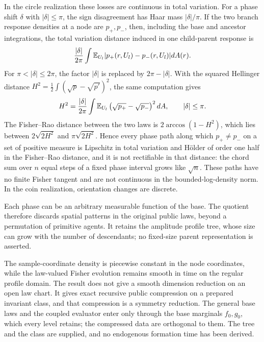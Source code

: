 In the circle realization these losses are continuous in total variation. For a phase shift $\delta$ with $|\delta|\le\pi$, the sign disagreement has Haar mass $|\delta|/\pi$. If the two branch response densities at a node are $p_+,p_-$, then, including the base and ancestor integrations, the total variation distance induced in one child-parent response is
\begin{equation}
 \frac{|\delta|}{2\pi}\int\mathbb E_{U_l}|p_+(r,U_l)-p_-(r,U_l)|dA(r).
 \label{eq:boundary-tree-tv}
\end{equation}
For $\pi<|\delta|\le2\pi$, the factor $|\delta|$ is replaced by $2\pi-|\delta|$. With the squared Hellinger distance $H^2=\frac12\int(\sqrt{p}-\sqrt{p'})^2$, the same computation gives
\begin{equation}
 H^2=\frac{|\delta|}{2\pi}\int\mathbb E_{U_l}\left(\sqrt{p_+}-\sqrt{p_-}\right)^2dA,
 \qquad |\delta|\le\pi.
 \label{eq:boundary-tree-hellinger}
\end{equation}
The Fisher--Rao distance between the two laws is $2\arccos(1-H^2)$, which lies between $2\sqrt{2H^2}$ and $\pi\sqrt{2H^2}$. Hence every phase path along which $p_+\ne p_-$ on a set of positive measure is Lipschitz in total variation and H\"older of order one half in the Fisher--Rao distance, and it is not rectifiable in that distance: the chord sum over $n$ equal steps of a fixed phase interval grows like $\sqrt n$. These paths have no finite Fisher tangent and are not continuous in the bounded-log-density norm. In the coin realization, orientation changes are discrete.

Each phase can be an arbitrary measurable function of the base. The quotient therefore discards spatial patterns in the original public laws, beyond a permutation of primitive agents. It retains the amplitude profile tree, whose size can grow with the number of descendants; no fixed-size parent representation is asserted.

The sample-coordinate density is piecewise constant in the node coordinates, while the law-valued Fisher evolution remains smooth in time on the regular profile domain. The result does not give a smooth dimension reduction on an open law chart. It gives exact recursive public compression on a prepared invariant class, and that compression is a symmetry reduction. The general base laws and the coupled evaluator enter only through the base marginals $f_0,g_0$, which every level retains; the compressed data are orthogonal to them. The tree and the class are supplied, and no endogenous formation time has been derived.

